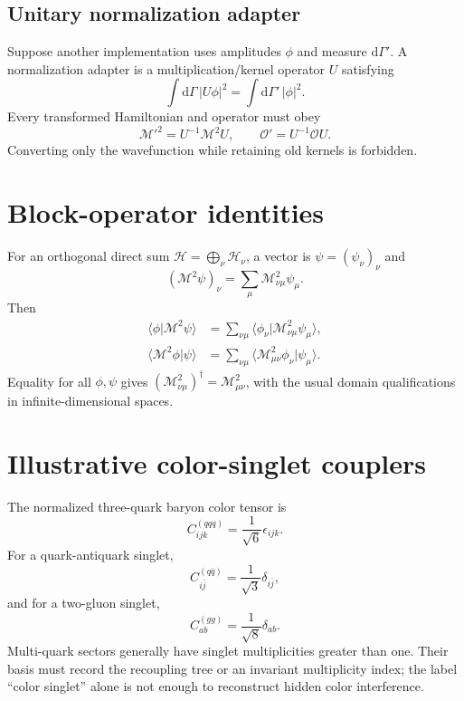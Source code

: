 \documentclass[11pt]{article}
\newcommand{\dd}{\mathrm{d}}
\newcommand{\Hil}{\mathcal H}
\newcommand{\cO}{\mathcal O}
\newcommand{\cM}{\mathcal M}
\begin{document}
\subsection{Unitary normalization adapter}

Suppose another implementation uses amplitudes \(\phi\) and measure
\(\dd\Gamma'\).  A normalization adapter is a multiplication/kernel operator
\(U\) satisfying
\begin{equation}
 \int\dd\Gamma\,|U\phi|^2
 =\int\dd\Gamma'\,|\phi|^2.
\label{eq:normalization-isometry}
\end{equation}
Every transformed Hamiltonian and operator must obey
\begin{equation}
 \cM'^2=U^{-1}\cM^2U,
 \qquad
 \cO'=U^{-1}\cO U.
\label{eq:normalization-operator-transform}
\end{equation}
Converting only the wavefunction while retaining old kernels is forbidden.

\section{Block-operator identities}
\label{app:block}

For an orthogonal direct sum \(\Hil=\bigoplus_\nu\Hil_\nu\), a vector is
\(\psi=(\psi_\nu)_\nu\) and
\begin{equation}
 (\cM^2\psi)_\nu=\sum_\mu\cM^2_{\nu\mu}\psi_\mu.
\label{eq:block-action}
\end{equation}
Then
\begin{align}
 \langle\phi|\cM^2\psi\rangle
 &=\sum_{\nu\mu}
 \langle\phi_\nu|\cM^2_{\nu\mu}\psi_\mu\rangle,
\label{eq:block-inner-1}\\
 \langle\cM^2\phi|\psi\rangle
 &=\sum_{\nu\mu}
 \langle\cM^2_{\mu\nu}\phi_\nu|\psi_\mu\rangle.
\label{eq:block-inner-2}
\end{align}
Equality for all \(\phi,\psi\) gives
\((\cM^2_{\nu\mu})^\dagger=\cM^2_{\mu\nu}\), with the usual domain
qualifications in infinite-dimensional spaces.

\section{Illustrative color-singlet couplers}
\label{app:color}

The normalized three-quark baryon color tensor is
\begin{equation}
 C^{(qqq)}_{ijk}=\frac{1}{\sqrt6}\epsilon_{ijk}.
\label{eq:qqq-singlet}
\end{equation}
For a quark-antiquark singlet,
\begin{equation}
 C^{(q\bar q)}_{i\bar j}=\frac{1}{\sqrt3}\delta_{i\bar j},
\label{eq:qqbar-singlet}
\end{equation}
and for a two-gluon singlet,
\begin{equation}
 C^{(gg)}_{ab}=\frac{1}{\sqrt8}\delta_{ab}.
\label{eq:gg-singlet}
\end{equation}
Multi-quark sectors generally have singlet multiplicities greater than one.
Their basis must record the recoupling tree or an invariant multiplicity
index; the label ``color singlet'' alone is not enough to reconstruct hidden
color interference.
\end{document}
